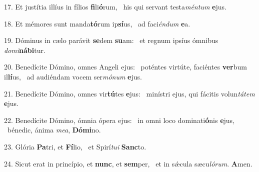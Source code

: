 17. Et justítia illíus in fílios \textbf{fi}li\textbf{ó}rum, \ast\  his qui servant testa\textit{mén}\textit{tum} \textbf{e}jus.\

18. Et mémores sunt manda\textbf{tó}rum ip\textbf{sí}us, \ast\  ad faci\textit{én}\textit{dum} \textbf{e}a.\

19. Dóminus in cælo parávit \textbf{se}dem \textbf{su}am: \ast\  et regnum ipsíus ómnibus \textit{do}\textit{mi}\textbf{ná}\textbf{bi}tur.\

20. Benedícite Dómino, omnes Angeli ejus: \dag\  poténtes virtúte, faciéntes \textbf{ver}bum il\textbf{lí}us, \ast\  ad audiéndam vocem ser\textit{mó}\textit{num} \textbf{e}jus.\

21. Benedícite Dómino, omnes vir\textbf{tú}tes \textbf{e}jus: \ast\  minístri ejus, qui fácitis volun\textit{tá}\textit{tem} \textbf{e}jus.\

22. Benedícite Dómino, ómnia ópera ejus: \dag\  in omni loco dominati\textbf{ó}nis \textbf{e}jus, \ast\  bénedic, ánima \textit{me}\textit{a}, \textbf{Dó}\textbf{mi}no.\

23. Glória \textbf{Pa}tri, et \textbf{Fí}lio, \ast\  et Spirí\textit{tu}\textit{i} \textbf{Sanc}to.\

24. Sicut erat in princípio, et \textbf{nunc}, et \textbf{sem}per, \ast\  et in sǽcula sæcu\textit{ló}\textit{rum}. \textbf{A}men.\

